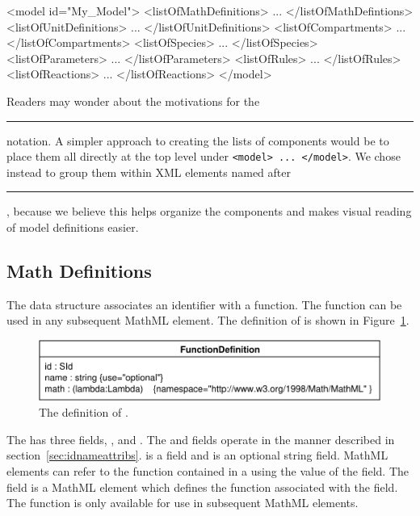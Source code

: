 \documentclass[10pt]{cekarticle}
\newcommand{\vref}[1]{\ref{#1}}
\begin{document}
\begin{example}
<model id="My_Model">
    <listOfMathDefinitions>
        ...
    </listOfMathDefintions>
    <listOfUnitDefinitions>
        ...
    </listOfUnitDefinitions>
    <listOfCompartments>
        ...
    </listOfCompartments>
    <listOfSpecies>
        ...
    </listOfSpecies>
    <listOfParameters>
        ...
    </listOfParameters>
    <listOfRules>
        ...
    </listOfRules>
    <listOfReactions>
        ...
    </listOfReactions>
</model>
\end{example}

Readers may wonder about the motivations for the
\rule{0.5in}{0.5pt} notation.  A simpler approach to
creating the lists of components would be to place them all directly
at the top level under \texttt{<model> ... </model>}.  We chose instead to
group them within XML elements named after
\rule{0.5in}{0.5pt}, because we believe this helps
organize the components and makes visual reading of model definitions
easier.

\subsection{Math Definitions}
\label{sec:functions}

The  data structure associates an identifier
with a function.  The function can be used in any subsequent
MathML  element.  The definition of
 is shown in
Figure~\vref{fig:mathdefinition}.

\begin{figure}[htb]
  \centering
  \includegraphics[scale = 0.68]{mathdefinition}
  \caption{The definition of .}
  \label{fig:mathdefinition}
\end{figure}

The  has three fields, ,
 and . The  and
 fields operate in the manner described in
section~\ref{sec:idnameattribs}.   is a 
field and  is an optional string field. MathML
elements can refer to the function contained in a
 using the value of the  field.
The  field is a MathML  element
which defines the function associated with the  field.
The function is only available for use in subsequent MathML
elements.
\end{document}
